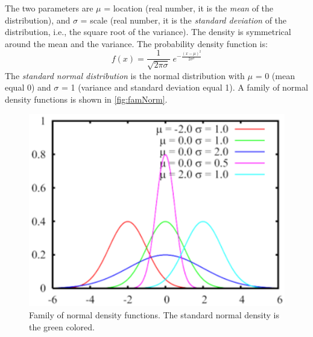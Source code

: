 The two parameters are $\mu$ = location (real number, it is the
\emph{mean} of the distribution), and $\sigma$ = scale (real
number, it is the \emph{standard deviation} of the distribution,
i.e., the square root of the variance). The density is symmetrical
around the mean and the variance. The probability density function
is:
\[
f(x) = \frac{1}{\sqrt{2 \pi \sigma}} \; e^{-\frac{(x-\mu)^2}{2
\sigma^2}}
\]
 The \emph{standard normal distribution} is the normal
distribution with $\mu$ = 0 (mean equal 0) and $\sigma$ = 1
(variance and standard deviation equal 1). A family of normal
density functions is shown in \autoref{fig:famNorm}.
\begin{figure}[htb]
    \begin{center}
        \includegraphics[scale=.5]{img/jsimg/4.9.eps}
    \end{center}
    \caption{Family of normal density functions. The
standard normal density is the green colored.}
    \label{fig:famNorm}
\end{figure}\\

